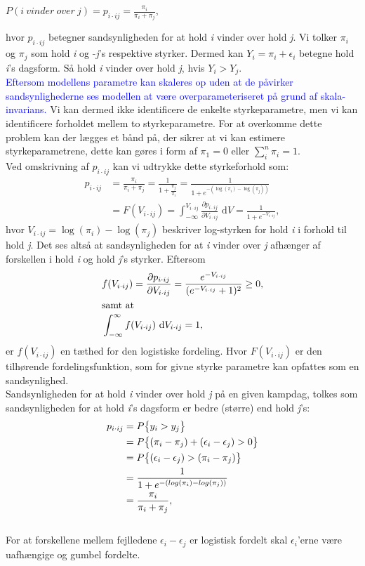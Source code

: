 \documentclass[11pt,a4paper]{article}
\begin{document}
\begin{center}
$P(i\ vinder\ over\ j) = p_{i\cdot ij} = \frac{\pi_i}{\pi_i+\pi_j}$,
\end{center}
hvor $p_{i\cdot ij}$ betegner sandsynligheden for at hold \textit{i} vinder over hold \textit{j}. Vi tolker $\pi_i$ og $\pi_j$ som hold \textit{i} og \textcolor{red}{-}\textit{j}'s respektive styrker. Dermed kan $Y_i=\pi_i+\epsilon_i$ betegne hold \textit{i}'s dagsform. Så hold \textit{i} vinder over hold \textit{j}, hvis $Y_i>Y_j$.\\ \textcolor{blue}{Eftersom modellens parametre kan skaleres op uden at de påvirker sandsynlighederne ses modellen at være overparameteriseret på grund af skala-invarians.} Vi kan dermed ikke identificere de enkelte styrkeparametre, men vi kan identificere forholdet mellem to styrkeparametre. For at overkomme dette problem kan der lægges et bånd på, der sikrer at vi kan estimere styrkeparametrene, dette kan gøres i form af $\pi_1 = 0$ eller $\sum_i^n \pi_i = 1$. \\
Ved omskrivning af $p_{i\cdot ij}$ kan vi udtrykke dette styrkeforhold som:
\begin{align*}
    p_{i\cdot ij} &= \frac{\pi_i}{\pi_i+\pi_j}=\frac{1}{1+\frac{\pi_j}{\pi_i}}=\frac{1}{1+e^{-(\log(\pi_i)-\log(\pi_j))}}\\
    &=F(V_{i\cdot ij})=\int_{-\infty}^{V_{i\cdot ij}} \frac{\partial p_{i\cdot ij}}{\partial V_{i\cdot ij}} \text{ d}V=\frac{1}{1+e^{-V_{i\cdot ij}}},
\end{align*}
hvor $V_{i\cdot ij}=\log(\pi_i)-\log(\pi_j)$ beskriver log-styrken for hold \textit{i} i forhold til hold \textit{j}. Det ses altså at sandsynligheden for at \textit{i} vinder over \textit{j} afhænger af forskellen i hold \textit{i} og hold \textit{j}'s styrker. Eftersom 
\begin{align*}
&f(V_{i\cdot ij})=\frac{\partial p_{i\cdot ij}}{\partial V_{i\cdot ij}} = \frac{e^{-V_{i\cdot ij}}}{(e^{-V_{i\cdot ij}}+1)^2} \geq 0, \\ \intertext{samt at}
&\int_{-\infty}^\infty f(V_{i\cdot ij}) \text{  d} V_{i\cdot ij} = 1,
\end{align*}
er $f(V_{i\cdot ij})$ en tæthed for den logistiske fordeling. Hvor $F(V_{i\cdot ij})$ er den tilhørende fordelingsfunktion, som for givne styrke parametre kan opfattes som en sandsynlighed.\\
Sandsynligheden for at hold \textit{i} vinder over hold \textit{j} på en given kampdag, tolkes som sandsynligheden for at hold \textit{i}'s dagsform er bedre (større) end hold \textit{j}'s:
\begin{align*}
p_{i\cdot ij}&=P\big{\{}y_i>y_j\big{\}}
\\&=P\big{\{}(\pi_i-\pi_j)+(\epsilon_i-\epsilon_j)>0\big{\}}
\\&=P\big{\{}(\epsilon_i-\epsilon_j)>(\pi_i-\pi_j)\big{\}}
\\&=\frac{1}{1+e^{-(log(\pi_i)-log(\pi_j))}} 
\\&=\frac{\pi_i}{\pi_i+\pi_j},\;\;
\end{align*}
\\
For at forskellene mellem fejlledene $\epsilon_i-\epsilon_j$ er logistisk fordelt skal $\epsilon_i$'erne være uafhængige og gumbel fordelte.
\end{document}
